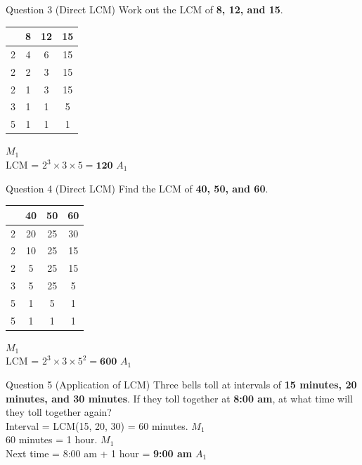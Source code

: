 \documentclass[12pt, a4paper, oneside]{article}
\begin{document}
\begin{solvingbox}{Question 3 (Direct LCM)}
Work out the LCM of \textbf{8, 12, and 15}. \\
\begin{tabular}{|c|c|c|c|} \hline
    & \textbf{8} & \textbf{12} & \textbf{15} \\ \hline
    2 & 4 & 6 & 15 \\ \hline
    2 & 2 & 3 & 15 \\ \hline
    2 & 1 & 3 & 15 \\ \hline
    3 & 1 & 1 & 5 \\ \hline
    5 & 1 & 1 & 1 \\ \hline
\end{tabular} \hfill $M_1$ \\
LCM = $2^3 \times 3 \times 5 = \mathbf{120}$ \hfill $A_1$
\end{solvingbox}

\begin{solvingbox}{Question 4 (Direct LCM)}
Find the LCM of \textbf{40, 50, and 60}. \\
\begin{tabular}{|c|c|c|c|} \hline
    & \textbf{40} & \textbf{50} & \textbf{60} \\ \hline
    2 & 20 & 25 & 30 \\ \hline
    2 & 10 & 25 & 15 \\ \hline
    2 & 5 & 25 & 15 \\ \hline
    3 & 5 & 25 & 5 \\ \hline
    5 & 1 & 5 & 1 \\ \hline
    5 & 1 & 1 & 1 \\ \hline
\end{tabular} \hfill $M_1$ \\
LCM = $2^3 \times 3 \times 5^2 = \mathbf{600}$ \hfill $A_1$
\end{solvingbox}

\begin{solvingbox}{Question 5 (Application of LCM)}
Three bells toll at intervals of \textbf{15 minutes, 20 minutes, and 30 minutes}. If they toll together at \textbf{8:00 am}, at what time will they toll together again? \\
Interval = LCM(15, 20, 30) = 60 minutes. \hfill $M_1$ \\
60 minutes = 1 hour. \hfill $M_1$ \\
Next time = 8:00 am + 1 hour = \textbf{9:00 am} \hfill $A_1$
\end{solvingbox}
\end{document}
